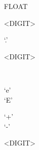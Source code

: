 \documentclass[convert={outext=.png}]{standalone}
\begin{document}
\begin{málrit}{FLOAT}
	\begin{rep}
		<DIGIT>
	\end{rep}
	`.'
	\begin{rep}
		<DIGIT>
	\end{rep}
	\begin{stack}
	\\
		\begin{stack}
			`e'\\
			`E'
		\end{stack}
		\begin{stack}
			`+'\\
			`-'
		\end{stack}
		\begin{rep}
			<DIGIT>
		\end{rep}
	\end{stack}
\end{málrit}
\end{document}
